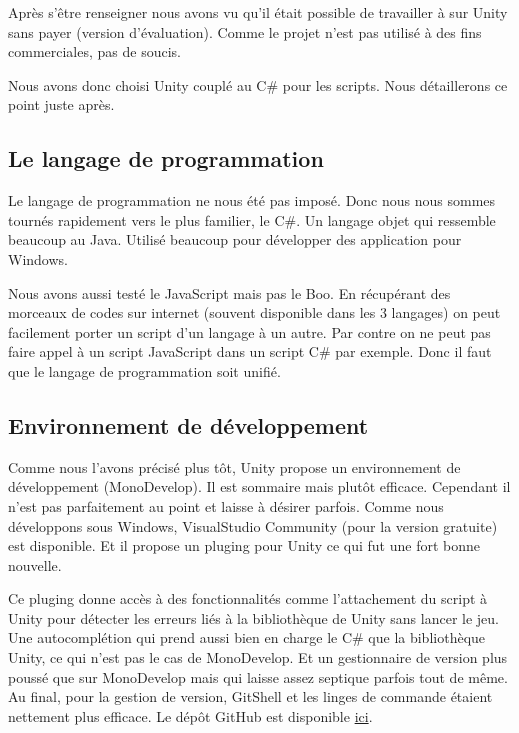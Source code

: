 \documentclass[a4paper,11pt]{myreport}
\begin{document}
  \par Après s'être renseigner nous avons vu qu'il était possible de travailler à sur Unity sans payer (version d'évaluation). Comme le projet n'est pas utilisé à des fins commerciales, pas de soucis.
  \par Nous avons donc choisi Unity couplé au C\# pour les scripts. Nous détaillerons ce point juste après.
  
  \subsection{Le langage de programmation}
  \par Le langage de programmation ne nous été pas imposé. Donc nous nous sommes tournés rapidement vers le plus familier, le C\#. Un langage objet qui ressemble beaucoup au Java. Utilisé beaucoup pour développer des application pour Windows.
  \par Nous avons aussi testé le JavaScript mais pas le Boo. En récupérant des morceaux de codes sur internet (souvent disponible dans les 3 langages) on peut facilement porter un script d'un langage à un autre.
  Par contre on ne peut pas faire appel à un script JavaScript dans un script C\# par exemple. Donc il faut que le langage de programmation soit unifié.


\subsection{Environnement de développement}
\par Comme nous l'avons précisé plus tôt, Unity propose un environnement de développement (MonoDevelop). Il est sommaire mais plutôt efficace. Cependant il n'est pas parfaitement au point et laisse à désirer parfois.
Comme nous développons sous Windows, VisualStudio Community (pour la version gratuite) est disponible. Et il propose un pluging pour Unity ce qui fut une fort bonne nouvelle.
\par Ce pluging donne accès à des fonctionnalités comme l'attachement du script à Unity pour détecter les erreurs liés à la bibliothèque de Unity sans lancer le jeu. Une autocomplétion qui prend aussi bien en charge le C\# que la bibliothèque Unity, ce qui n'est pas le cas de MonoDevelop. Et un gestionnaire de version plus poussé que sur MonoDevelop mais qui laisse assez septique parfois tout de même.
Au final, pour la gestion de version, GitShell et les linges de commande étaient nettement plus efficace. Le dépôt GitHub est disponible \href{https://github.com/manumanmax/SeriousVR.git}{ici}.
\end{document}
